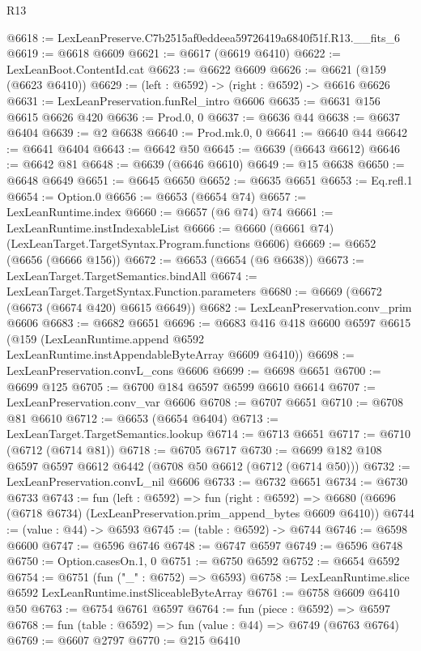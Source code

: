 \begin{lexlean}{R13}
\begin{coremodule}
@6618 := LexLeanPreserve.C7b2515af0eddeea59726419a6840f51f.R13.__fits_6
@6619 := @6618 @6609
@6621 := @6617 (@6619 @6410)
@6622 := LexLeanBoot.ContentId.cat
@6623 := @6622 @6609
@6626 := @6621 (@159 (@6623 @6410))
@6629 := (left : @6592) -> (right : @6592) -> @6616 @6626
@6631 := LexLeanPreservation.funRel_intro @6606
@6635 := @6631 @156 @6615 @6626 @420
@6636 := Prod.{0, 0}
@6637 := @6636 @44
@6638 := @6637 @6404
@6639 := @2 @6638
@6640 := Prod.mk.{0, 0}
@6641 := @6640 @44
@6642 := @6641 @6404
@6643 := @6642 @50
@6645 := @6639 (@6643 @6612)
@6646 := @6642 @81
@6648 := @6639 (@6646 @6610)
@6649 := @15 @6638
@6650 := @6648 @6649
@6651 := @6645 @6650
@6652 := @6635 @6651
@6653 := Eq.refl.{1}
@6654 := Option.{0}
@6656 := @6653 (@6654 @74)
@6657 := LexLeanRuntime.index
@6660 := @6657 (@6 @74) @74
@6661 := LexLeanRuntime.instIndexableList
@6666 := @6660 (@6661 @74) (LexLeanTarget.TargetSyntax.Program.functions @6606)
@6669 := @6652 (@6656 (@6666 @156))
@6672 := @6653 (@6654 (@6 @6638))
@6673 := LexLeanTarget.TargetSemantics.bindAll
@6674 := LexLeanTarget.TargetSyntax.Function.parameters
@6680 := @6669 (@6672 (@6673 (@6674 @420) @6615 @6649))
@6682 := LexLeanPreservation.conv_prim @6606
@6683 := @6682 @6651
@6696 := @6683
    @416
    @418
    @6600
    @6597
    @6615
    (@159 (LexLeanRuntime.append @6592 LexLeanRuntime.instAppendableByteArray @6609 @6410))
@6698 := LexLeanPreservation.convL_cons @6606
@6699 := @6698 @6651
@6700 := @6699 @125
@6705 := @6700 @184 @6597 @6599 @6610 @6614
@6707 := LexLeanPreservation.conv_var @6606
@6708 := @6707 @6651
@6710 := @6708 @81 @6610
@6712 := @6653 (@6654 @6404)
@6713 := LexLeanTarget.TargetSemantics.lookup
@6714 := @6713 @6651
@6717 := @6710 (@6712 (@6714 @81))
@6718 := @6705 @6717
@6730 := @6699 @182 @108 @6597 @6597 @6612 @6442 (@6708 @50 @6612 (@6712 (@6714 @50)))
@6732 := LexLeanPreservation.convL_nil @6606
@6733 := @6732 @6651
@6734 := @6730 @6733
@6743 := fun (left : @6592) =>
  fun (right : @6592) =>
  @6680 (@6696 (@6718 @6734) (LexLeanPreservation.prim_append_bytes @6609 @6410))
@6744 := (value : @44) -> @6593
@6745 := (table : @6592) -> @6744
@6746 := @6598 @6600
@6747 := @6596 @6746
@6748 := @6747 @6597
@6749 := @6596 @6748
@6750 := Option.casesOn.{1, 0}
@6751 := @6750 @6592
@6752 := @6654 @6592
@6754 := @6751 (fun ("_" : @6752) => @6593)
@6758 := LexLeanRuntime.slice @6592 LexLeanRuntime.instSliceableByteArray
@6761 := @6758 @6609 @6410 @50
@6763 := @6754 @6761 @6597
@6764 := fun (piece : @6592) => @6597
@6768 := fun (table : @6592) => fun (value : @44) => @6749 (@6763 @6764)
@6769 := @6607 @2797
@6770 := @215 @6410

\end{coremodule}
\end{lexlean}
